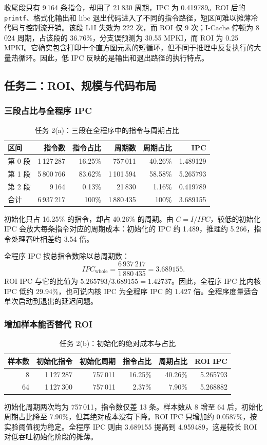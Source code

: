 \documentclass[12pt,a4paper,fontset=mac]{ctexart}
\begin{document}
收尾段只有 9\,164 条指令，却用了 21\,830 周期，IPC 为 0.419789。ROI 后的 \texttt{printf}、格式化输出和 libc 退出代码进入了不同的指令路径，短区间难以摊薄冷代码与控制流开销。该段 L1I 失效为 222 次，而 ROI 仅 9 次；I-Cache 停顿为 8\,024 周期，占该段的 36.76\%，分支误预测为 30.55 MPKI，而 ROI 为 0.25 MPKI。它确实包含打印十个直方图元素的短循环，但不同于推理中反复执行的大量热循环。因此，低 IPC 反映的是输出和退出路径的执行特点。

\subsection{任务二：ROI、规模与代码布局}
\subsubsection{三段占比与全程序 IPC}
\begin{table}[H]\centering\footnotesize
\caption{任务 2(a)：三段在全程序中的指令与周期占比}\label{tab:share}
\begin{tabular}{lrrrrr}\toprule
区间 & 指令数 & 指令占比 & 周期数 & 周期占比 & IPC \\\midrule
第 0 段 & 1\,127\,287 & 16.25\% & 757\,011 & 40.26\% & 1.489129 \\
第 1 段 & 5\,800\,766 & 83.62\% & 1\,101\,594 & 58.58\% & 5.265793 \\
第 2 段 & 9\,164 & 0.13\% & 21\,830 & 1.16\% & 0.419789 \\
\midrule
合计 & 6\,937\,217 & 100\% & 1\,880\,435 & 100\% & 3.689155 \\
\bottomrule\end{tabular}\end{table}
初始化只占 16.25\% 的指令，却占 40.26\% 的周期。由 $C=I/IPC$，较低的初始化 IPC 会放大每条指令对应的周期成本：初始化的 IPC 约 1.489，推理约 5.266，指令处理吞吐相差约 3.54 倍。

全程序 IPC 按总指令数除以总周期数：
\[
IPC_{\mathrm{whole}}=\frac{6\,937\,217}{1\,880\,435}=3.689155.
\]
ROI IPC 与它的比值为 $5.265793/3.689155=1.42737$。因此，全程序 IPC 比内核 IPC 低约 29.94\%，也可说内核 IPC 为全程序 IPC 的 1.427 倍。全程序度量适合单次启动到退出的延迟问题。

\subsubsection{增加样本能否替代 ROI}
\begin{table}[H]\centering\small
\caption{任务 2(b)：初始化的绝对成本与占比}\label{tab:scale64}
\begin{tabular}{rrrrrr}\toprule
样本数 & 初始化指令 & 初始化周期 & 指令占比 & 周期占比 & ROI IPC \\\midrule
8 & 1\,127\,287 & 757\,011 & 16.25\% & 40.26\% & 5.265793 \\
64 & 1\,127\,300 & 757\,011 & 2.37\% & 7.90\% & 5.268882 \\
\bottomrule\end{tabular}\end{table}
初始化周期两次均为 757\,011，指令数仅差 13 条。样本数从 8 增至 64 后，初始化周期占比降至 7.90\%，但其绝对成本没有下降。ROI IPC 只增加约 0.0587\%，按实验阈值视为稳定。全程序 IPC 则由 3.689155 提高到 4.959489，这是较长 ROI 对低吞吐初始化阶段的摊薄。
\end{document}
